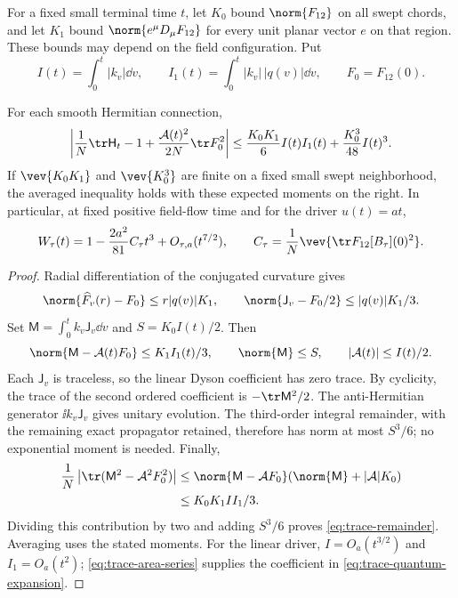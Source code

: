 For a fixed small terminal time $t$, let $K_0$ bound $\norm{F_{12}}$
on all swept chords, and let $K_1$ bound
$\norm{e^\mu D_\mu F_{12}}$ for every unit planar vector $e$ on
that region. These bounds may depend on the field configuration.
Put
\begin{equation}\label{eq:trace-geometric-integrals}
 I(t)=\int_0^t|k_v|\dd v,\qquad
 I_1(t)=\int_0^t|k_v|\,|q(v)|\dd v,
 \qquad F_0=F_{12}(0).
\end{equation}

\begin{proposition}
\label{prop:trace-remainder}
For each smooth Hermitian connection,
\begin{equation}\label{eq:trace-remainder}
 \left|\frac1N\tr\mathsf H_t-1+
             \frac{\mathcal A(t)^2}{2N}\tr F_0^2\right|
 \le\frac{K_0K_1}{6}I(t)I_1(t)+\frac{K_0^3}{48}I(t)^3.
\end{equation}
If $\vev{K_0K_1}$ and $\vev{K_0^3}$ are finite on a fixed small
swept neighborhood, the averaged inequality holds with these
expected moments on the right. In particular, at fixed positive
field-flow time and for the driver $u(t)=at$,
\begin{equation}\label{eq:trace-quantum-expansion}
 W_\tau(t)=1-\frac{2a^2}{81}C_\tau t^3+O_{\tau,a}(t^{7/2}),
 \qquad C_\tau=\frac1N\vev{\tr F_{12}[B_\tau](0)^2}.
\end{equation}
\end{proposition}
\begin{proof}
Radial differentiation of the conjugated curvature gives
\[
 \norm{\widehat F_v(r)-F_0}\le r|q(v)|K_1,\qquad
 \norm{\mathsf J_v-F_0/2}\le |q(v)|K_1/3.
\]
Set $\mathsf M=\int_0^t k_v\mathsf J_v\dd v$ and
$S=K_0I(t)/2$. Then
\[
 \norm{\mathsf M-\mathcal A(t)F_0}\le K_1I_1(t)/3,
 \qquad \norm{\mathsf M}\le S,\qquad |\mathcal A(t)|\le I(t)/2.
\]
Each $\mathsf J_v$ is traceless, so the linear Dyson coefficient
has zero trace. By cyclicity, the trace of the second ordered
coefficient is $-\tr\mathsf M^2/2$. The anti-Hermitian generator
$\ii k_v\mathsf J_v$ gives unitary evolution. The third-order
integral remainder, with the remaining exact propagator retained,
therefore has norm at most $S^3/6$; no exponential moment is needed.
Finally,
\begin{align*}
 \frac1N\left|\tr(\mathsf M^2-\mathcal A^2F_0^2)\right|
 &\le\norm{\mathsf M-\mathcal A F_0}
                   (\norm{\mathsf M}+|\mathcal A|K_0)\\
 &\le K_0K_1I I_1/3.
\end{align*}
Dividing this contribution by two and adding $S^3/6$ proves
\eqref{eq:trace-remainder}. Averaging uses the stated moments.
For the linear driver, $I=O_a(t^{3/2})$ and $I_1=O_a(t^2)$;
\eqref{eq:trace-area-series} supplies the coefficient in
\eqref{eq:trace-quantum-expansion}.
\end{proof}

